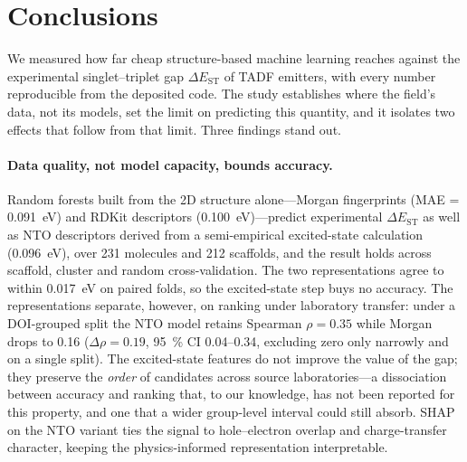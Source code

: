 
\section{Conclusions}\label{sec:conclusions}

We measured how far cheap structure-based machine learning reaches against the
experimental singlet--triplet gap $\Delta E_\text{ST}$ of TADF emitters, with every
number reproducible from the deposited code. The study establishes where the field's
data, not its models, set the limit on predicting this quantity, and it isolates two
effects that follow from that limit. Three findings stand out.

\paragraph{Data quality, not model capacity, bounds accuracy.}
Random forests built from the 2D structure alone---Morgan fingerprints
(MAE = \qty{0.091}{\electronvolt}) and RDKit descriptors
(\qty{0.100}{\electronvolt})---predict experimental $\Delta E_\text{ST}$ as well
as NTO descriptors derived from a semi-empirical excited-state calculation
(\qty{0.096}{\electronvolt}), over \num{231} molecules and \num{212} scaffolds, and
the result holds across scaffold, cluster and random cross-validation. The two
representations agree to within \qty{0.017}{\electronvolt} on paired folds, so the
excited-state step buys no accuracy. The representations separate, however, on
ranking under laboratory transfer: under a DOI-grouped split the NTO model retains
Spearman $\rho = \num{0.35}$ while Morgan drops to \num{0.16}
($\Delta\rho = \num{0.19}$, \qty{95}{\percent} CI \numrange{0.04}{0.34}, excluding zero
only narrowly and on a single split). The excited-state features do not improve the
value of the gap; they preserve the \emph{order} of candidates across source
laboratories---a dissociation between accuracy and ranking that, to our knowledge, has
not been reported for this property, and one that a wider group-level interval could
still absorb.
SHAP on the NTO variant ties the signal to hole--electron overlap and
charge-transfer character, keeping the physics-informed representation interpretable.

